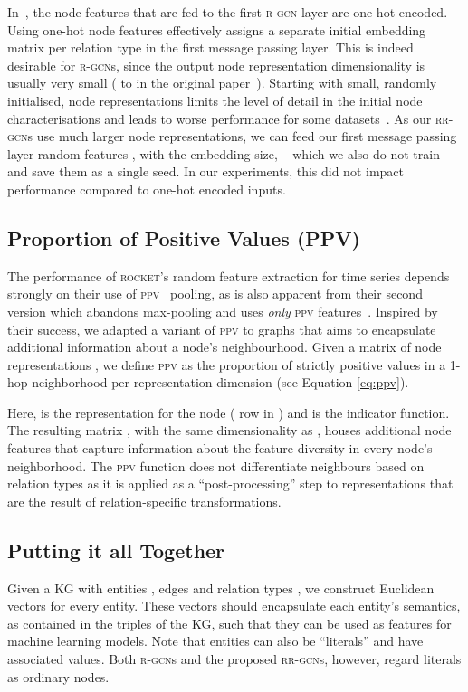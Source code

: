 \documentclass{llncs}
\begin{document}
In~\cite{schlichtkrull2018modeling}, the node features that are fed to the first \textsc{r-gcn} layer are one-hot encoded. Using one-hot node features effectively assigns a separate initial embedding matrix  per relation type in the first message passing layer. This is indeed desirable for \textsc{r-gcn}s, since the output node representation dimensionality is usually very small ( to  in the original paper~\cite{schlichtkrull2018modeling}). Starting with small, randomly initialised, node representations limits the level of detail in the initial node characterisations and leads to worse performance for some datasets~\cite{thanapalasingam2021relational}. 
As our \textsc{rr-gcn}s use much larger node representations, we can feed our first message passing layer random features , with  the embedding size, -- which we also do not train -- and save them as a single seed. In our experiments, this did not impact performance compared to one-hot encoded inputs.

\subsection{Proportion of Positive Values (PPV)} \label{subsec:ppv}
The performance of \textsc{rocket}'s random feature extraction for time series depends strongly on their use of \textsc{ppv}~\cite{dempster2020rocket} pooling, as is also apparent from their second version which abandons max-pooling and uses \textit{only} \textsc{ppv} features~\cite{dempster2021minirocket}. Inspired by their success, we adapted a variant of \textsc{ppv} to graphs that aims to encapsulate additional information about a node's neighbourhood. Given a matrix of node representations , we define \textsc{ppv} as the proportion of strictly positive values in a 1-hop neighborhood per representation dimension (see Equation \ref{eq:ppv}).

Here,  is the representation for the  node ( row in ) and  is the indicator function. The resulting matrix , with the same dimensionality as , houses additional node features that capture information about the feature diversity in every node's neighborhood.
The \textsc{ppv} function does not differentiate neighbours based on relation types as it is applied as a ``post-processing'' step to representations that are the result of relation-specific transformations.

\subsection{Putting it all Together}
Given a KG  with entities , edges  and relation types , we construct Euclidean vectors for every entity. These vectors should encapsulate each entity's semantics, as contained in the triples of the KG, such that they can be used as features for machine learning models. 
Note that entities can also be ``literals'' and have associated values. Both \textsc{r-gcn}s and the proposed \textsc{rr-gcn}s, however, regard literals as ordinary nodes.
\end{document}
